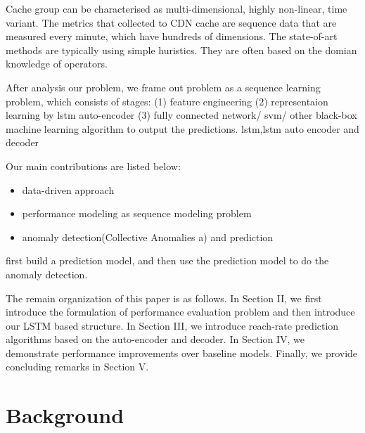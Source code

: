 \documentclass[review]{elsarticle}
\begin{document}
Cache group can be characterised as multi-dimensional, highly non-linear, time variant. The metrics that collected to CDN cache are sequence data that are measured every minute, which have hundreds of dimensions. The state-of-art methods are typically using simple huristics. They are often based on the domian knowledge of operators. 

After analysis our problem, we frame out problem as a sequence learning problem, which consists of stages: (1) feature engineering (2) representaion learning by lstm auto-encoder (3) fully connected network/ svm/ other black-box machine learning algorithm to output the predictions. 
lstm,lstm auto encoder and decoder

Our main contributions are listed below:
\begin{itemize}
  \item data-driven approach
  \item performance modeling as sequence modeling problem
  \item anomaly detection(Collective Anomalies a) and prediction
\end{itemize}

first build a prediction model, and then use the prediction model to do the anomaly detection.

The remain organization of this paper is as follows. In Section II, we 
first  introduce the formulation of performance evaluation problem
and  then introduce  our LSTM  based  structure. In Section
III, we introduce reach-rate prediction algorithms based on the
auto-encoder and decoder. In Section IV, we demonstrate
performance  improvements over baseline models. 
Finally, we provide concluding remarks in Section V.
\section{Background}
\end{document}
